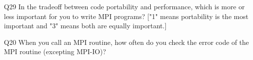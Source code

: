 \begin{description}%
\item{Q29} In the tradeoff between code portability and performance, which is more or less important for you to write MPI programs? ["1" means portability is the most important and "3" means both are equally important.]%
\item{Q20} When you call an MPI routine, how often do you check the error code of the MPI routine  (excepting MPI-IO)?%
\end{description}%
